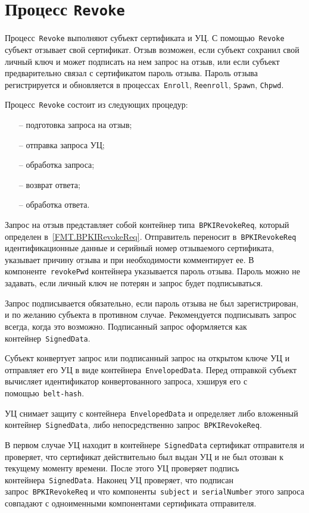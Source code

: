 \section{Процесс \texttt{Revoke}}\label{PROCESSES.Revoke}

Процесс~\texttt{Revoke} выполняют субъект сертификата и УЦ. 
С помощью~\texttt{Revoke} субъект отзывает свой сертификат.
Отзыв возможен, если субъект сохранил свой личный ключ и может подписать 
на нем запрос на отзыв, или если субъект предварительно связал с 
сертификатом пароль отзыва. Пароль отзыва регистрируется и обновляется
в процессах~\texttt{Enroll}, \texttt{Reenroll}, \texttt{Spawn}, 
\texttt{Chpwd}.

Процесс~\texttt{Revoke} состоит из следующих процедур:
\begin{itemize}
\item[--]
подготовка запроса на отзыв;
\item[--]
отправка запроса УЦ;
\item[--]
обработка запроса;
\item[--]
возврат ответа;
\item[--]
обработка ответа.
\end{itemize}

Запрос на отзыв представляет собой контейнер типа~\texttt{BPKIRevokeReq},
который определен в~\ref{FMT.BPKIRevokeReq}.
Отправитель переносит в~\texttt{BPKIRevokeReq}
идентификационные данные и серийный номер отзываемого сертификата,
указывает причину отзыва и при необходимости комментирует ее.
В компоненте~\texttt{revokePwd} контейнера указывается пароль отзыва.
Пароль можно не задавать, если личный ключ не потерян и запрос будет
подписываться. 

Запрос подписывается обязательно, если пароль отзыва не был 
зарегистрирован, и по желанию субъекта в противном случае.
%
Рекомендуется подписывать запрос всегда, когда это возможно.
%
Подписанный запрос оформляется как контейнер~\texttt{SignedData}.

Субъект конвертует запрос или подписанный запрос на открытом ключе УЦ
и отправляет его УЦ в виде контейнера~\texttt{EnvelopedData}.
Перед отправкой субъект вычисляет идентификатор конвертованного запроса,
хэшируя его с помощью~\texttt{belt-hash}.

УЦ снимает защиту с контейнера~\texttt{EnvelopedData} и определяет 
либо вложенный контейнер~\texttt{SignedData}, либо непосредственно
запрос~\texttt{BPKIRevokeReq}.

В первом случае УЦ находит в контейнере~\texttt{SignedData}
сертификат отправителя и проверяет, что сертификат действительно 
был выдан УЦ и не был отозван к текущему моменту времени. 
После этого УЦ проверяет подпись контейнера~\texttt{SignedData}. 
Наконец УЦ проверяет, что  подписан запрос~\texttt{BPKIRevokeReq} и что 
компоненты~\texttt{subject} и~\texttt{serialNumber} этого запроса 
совпадают с одноименными компонентами сертификата отправителя.

